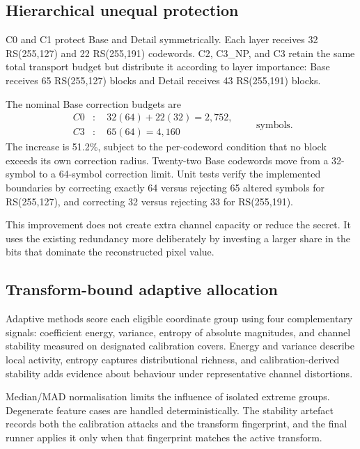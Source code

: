 \subsection{Hierarchical unequal protection}

C0 and C1 protect Base and Detail symmetrically. Each layer receives 32 RS(255,127) and 22 RS(255,191) codewords. C2, C3\_NP, and C3 retain the same total transport budget but distribute it according to layer importance: Base receives 65 RS(255,127) blocks and Detail receives 43 RS(255,191) blocks.

The nominal Base correction budgets are
\begin{equation}
\begin{aligned}
C0 &: \quad 32(64)+22(32)=2,752,\\
C3 &: \quad 65(64)=4,160
\end{aligned}
\qquad \text{symbols}.
\end{equation}
The increase is 51.2\%, subject to the per-codeword condition that no block exceeds its own correction radius. Twenty-two Base codewords move from a 32-symbol to a 64-symbol correction limit. Unit tests verify the implemented boundaries by correcting exactly 64 versus rejecting 65 altered symbols for RS(255,127), and correcting 32 versus rejecting 33 for RS(255,191).

This improvement does not create extra channel capacity or reduce the secret. It uses the existing redundancy more deliberately by investing a larger share in the bits that dominate the reconstructed pixel value.

\subsection{Transform-bound adaptive allocation}

Adaptive methods score each eligible coordinate group using four complementary signals: coefficient energy, variance, entropy of absolute magnitudes, and channel stability measured on designated calibration covers. Energy and variance describe local activity, entropy captures distributional richness, and calibration-derived stability adds evidence about behaviour under representative channel distortions.

Median/MAD normalisation limits the influence of isolated extreme groups. Degenerate feature cases are handled deterministically. The stability artefact records both the calibration attacks and the transform fingerprint, and the final runner applies it only when that fingerprint matches the active transform.


